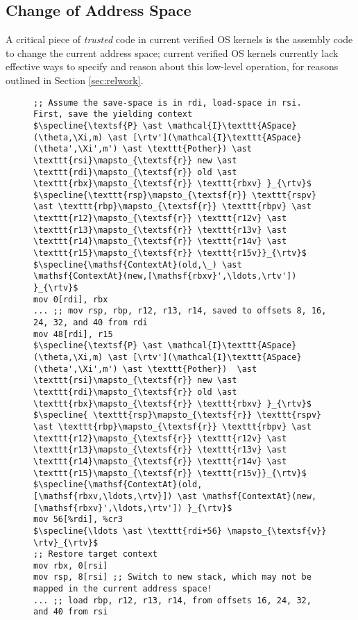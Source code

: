 \subsection{Change of Address Space}
A critical piece of \emph{trusted} code in current verified OS kernels is the assembly code to change the current address space; current verified OS kernels currently 
lack effective ways to specify and reason about this low-level operation, for reasons outlined in Section \ref{sec:relwork}.
\begin{figure}\footnotesize
\begin{lstlisting}[mathescape]
;; Assume the save-space is in rdi, load-space in rsi. First, save the yielding context
$\specline{\textsf{P} \ast \mathcal{I}\texttt{ASpace}(\theta,\Xi,m) \ast [\rtv'](\mathcal{I}\texttt{ASpace}(\theta',\Xi',m') \ast \texttt{Pother}) \ast \texttt{rsi}\mapsto_{\textsf{r}} new \ast \texttt{rdi}\mapsto_{\textsf{r}} old \ast \texttt{rbx}\mapsto_{\textsf{r}} \texttt{rbxv} }_{\rtv}$
$\specline{\texttt{rsp}\mapsto_{\textsf{r}} \texttt{rspv} \ast \texttt{rbp}\mapsto_{\textsf{r}} \texttt{rbpv} \ast \texttt{r12}\mapsto_{\textsf{r}} \texttt{r12v} \ast \texttt{r13}\mapsto_{\textsf{r}} \texttt{r13v} \ast \texttt{r14}\mapsto_{\textsf{r}} \texttt{r14v} \ast \texttt{r15}\mapsto_{\textsf{r}} \texttt{r15v}}_{\rtv}$
$\specline{\mathsf{ContextAt}(old,\_) \ast \mathsf{ContextAt}(new,[\mathsf{rbxv}',\ldots,\rtv']) }_{\rtv}$
mov 0[rdi], rbx
... ;; mov rsp, rbp, r12, r13, r14, saved to offsets 8, 16, 24, 32, and 40 from rdi
mov 48[rdi], r15
$\specline{\textsf{P} \ast \mathcal{I}\texttt{ASpace}(\theta,\Xi,m) \ast [\rtv'](\mathcal{I}\texttt{ASpace}(\theta',\Xi',m') \ast \texttt{Pother})  \ast  \texttt{rsi}\mapsto_{\textsf{r}} new \ast \texttt{rdi}\mapsto_{\textsf{r}} old \ast \texttt{rbx}\mapsto_{\textsf{r}} \texttt{rbxv} }_{\rtv}$
$\specline{ \texttt{rsp}\mapsto_{\textsf{r}} \texttt{rspv} \ast \texttt{rbp}\mapsto_{\textsf{r}} \texttt{rbpv} \ast \texttt{r12}\mapsto_{\textsf{r}} \texttt{r12v} \ast \texttt{r13}\mapsto_{\textsf{r}} \texttt{r13v} \ast \texttt{r14}\mapsto_{\textsf{r}} \texttt{r14v} \ast \texttt{r15}\mapsto_{\textsf{r}} \texttt{r15v}}_{\rtv}$
$\specline{\mathsf{ContextAt}(old,[\mathsf{rbxv,\ldots,\rtv}]) \ast \mathsf{ContextAt}(new,[\mathsf{rbxv}',\ldots,\rtv']) }_{\rtv}$
mov 56[%rdi], %cr3
$\specline{\ldots \ast \texttt{rdi+56} \mapsto_{\textsf{v}} \rtv}_{\rtv}$    
;; Restore target context
mov rbx, 0[rsi] 
mov rsp, 8[rsi] ;; Switch to new stack, which may not be mapped in the current address space!
... ;; load rbp, r12, r13, r14, from offsets 16, 24, 32, and 40 from rsi

\end{lstlisting}
\end{figure}
